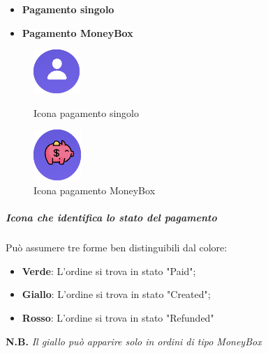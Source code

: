             \begin{itemize}
                \item \textbf{Pagamento singolo}
                \item \textbf{Pagamento MoneyBox}
            \end{itemize}
            \begin{figure}[H]
                \centering
                \begin{minipage}{0.45\textwidth}
                    \centering
                    \includegraphics[scale=0.8]{immagini/Transaction/singleIcon.png} 
                    \caption{Icona pagamento singolo}
                \end{minipage}\hfill
                \begin{minipage}{0.45\textwidth}
                \centering
                    \includegraphics[scale=0.8]{immagini/Transaction/MoneyBoxIcon.png} 
                    \caption{Icona pagamento MoneyBox}
                \end{minipage}
            \end{figure}
            \subparagraph{Icona che identifica lo stato del pagamento}
            Può assumere tre forme ben distinguibili dal colore:
            \begin{itemize}
                \item \textbf{Verde}: L'ordine si trova in stato "Paid";
                \item \textbf{Giallo}: L'ordine si trova in stato "Created";
                \item \textbf{Rosso}: L'ordine si trova in stato "Refunded"
            \end{itemize}
            \textbf{N.B.} \textit{Il giallo può apparire solo in ordini di tipo MoneyBox}
